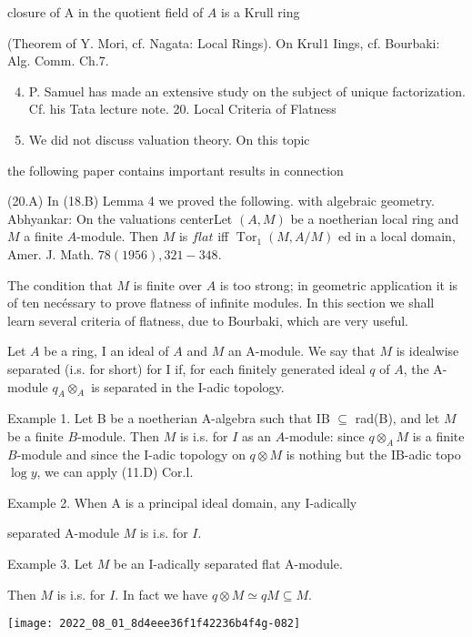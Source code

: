 closure of A in the quotient field of $A$ is a Krull ring

(Theorem of $\mathrm{Y}$. Mori, cf. Nagata: Local Rings). On Krul1 Iings, cf. Bourbaki: Alg. Comm. Ch.7.

\begin{enumerate}
  \setcounter{enumi}{3}
  \item P. Samuel has made an extensive study on the subject of unique factorization. Cf. his Tata lecture note. 20. Local Criteria of Flatness

  \item We did not discuss valuation theory. On this topic

\end{enumerate}
the following paper contains important results in connection

(20.A) In (18.B) Lemma 4 we proved the following. with algebraic geometry. Abhyankar: On the valuations centerLet $(A, M)$ be a noetherian local ring and $M$ a finite $A$-module. Then $M$ is $f l a t$ iff $\operatorname{Tor}_{1}(M, A / M)$ ed in a local domain, Amer. J. Math. $78(1956), 321-348 .$

The condition that $M$ is finite over $A$ is too strong; in geometric application it is of ten necéssary to prove flatness of infinite modules. In this section we shall learn several criteria of flatness, due to Bourbaki, which are very useful.

Let $A$ be a ring, I an ideal of $A$ and $M$ an A-module. We say that $M$ is idealwise separated (i.s. for short) for I if, for each finitely generated ideal $q$ of $A$, the A-module $q_{A} \otimes_{A}$ is separated in the I-adic topology.

Example 1. Let B be a noetherian A-algebra such that IB $\subseteq$ rad(B), and let $M$ be a finite $B$-module. Then $M$ is i.s. for $I$ as an $A$-module: since $q \otimes_{A} M$ is a finite $B$-module and since the I-adic topology on $q \otimes M$ is nothing but the IB-adic topo$\log y$, we can apply (11.D) Cor.l.

Example 2. When A is a principal ideal domain, any I-adically

separated A-module $M$ is i.s. for $I$.

Example 3. Let $M$ be an I-adically separated flat A-module.

Then $M$ is i.s. for $I$. In fact we have $q \otimes M \simeq q M \subseteq M$.

\texttt{[image: 2022\_08\_01\_8d4eee36f1f42236b4f4g-082]}

